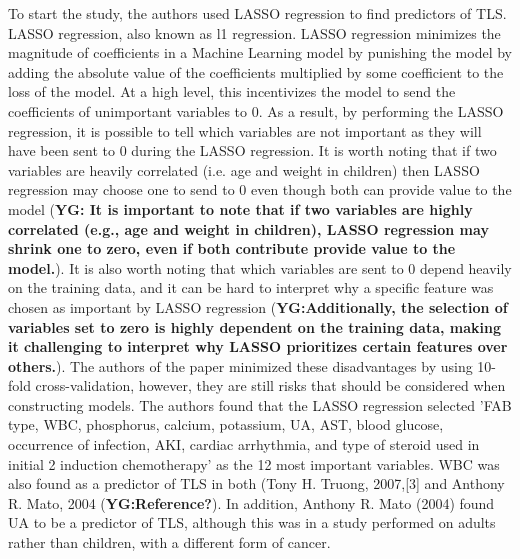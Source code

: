 \documentclass{article}
\begin{document}
To start the study, the authors used LASSO regression to find predictors of TLS. LASSO regression, also known as l1 regression. LASSO regression minimizes the magnitude of coefficients in a Machine Learning model by punishing the model by adding the absolute value of the coefficients multiplied by some coefficient to the loss of the model. At a high level, this incentivizes the model to send the coefficients of unimportant variables to 0. As a result, by performing the LASSO regression, it is possible to tell which variables are not important as they will have been sent to 0 during the LASSO regression. It is worth noting that if two variables are heavily correlated (i.e. age and weight in children) then LASSO regression may choose one to send to 0 even though both can provide value to the model (\textbf{YG: It is important to note that if two variables are highly correlated (e.g., age and weight in children), LASSO regression may shrink one to zero, even if both contribute provide value to the model.}). It is also worth noting that which variables are sent to 0 depend heavily on the training data, and it can be hard to interpret why a specific feature was chosen as important by LASSO regression (\textbf{YG:Additionally, the selection of variables set to zero is highly dependent on the training data, making it challenging to interpret why LASSO prioritizes certain features over others.}). The authors of the paper minimized these disadvantages by using 10-fold cross-validation, however, they are still risks that should be considered when constructing models. The authors found that the LASSO regression selected 'FAB type, WBC, phosphorus, calcium, potassium, UA, AST, blood glucose, occurrence of infection, AKI, cardiac arrhythmia, and type of steroid used in initial 2 induction chemotherapy' as the 12 most important variables. WBC was also found as a predictor of TLS in both (Tony H. Truong, 2007,[3] and Anthony R. Mato, 2004 (\textbf{YG:Reference?}). In addition, Anthony R. Mato (2004) found UA to be a predictor of TLS, although this was in a study performed on adults rather than children, with a different form of cancer.
\end{document}
